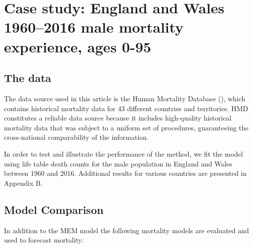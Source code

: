 \documentclass[T0_MEM]{subfiles}
\begin{document}
\section{Case study: England and Wales 1960--2016 male mortality experience, ages 0-95}

\subsection{The data}
The data source used in this article is the Human Mortality Database (\citeyear{hmd2018}), which contains historical mortality data for 43 different countries and territories. HMD constitutes a reliable data source because it includes high-quality historical mortality data that was subject to a uniform set of procedures, guaranteeing the cross-national comparability of the information.

In order to test and illustrate the performance of the method, we fit the model using life
table death counts for the male population in England and Wales between 1960 and 2016.
Additional results for various countries are presented in Appendix B.


\subsection{Model Comparison}
In addition to the MEM model the following mortality models are evaluated and used to forecast mortality:
\end{document}
